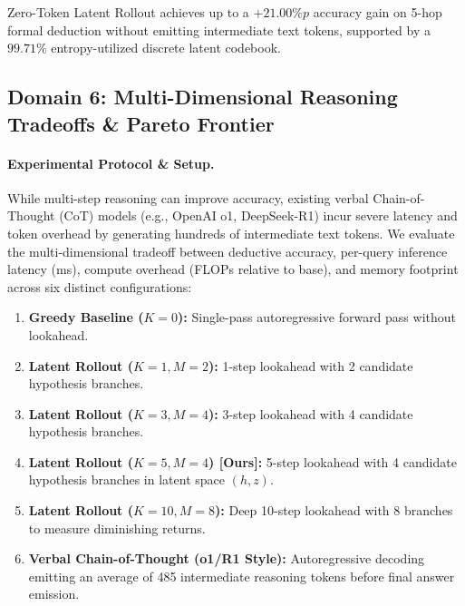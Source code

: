 \begin{takeawaybox}
Zero-Token Latent Rollout achieves up to a $+21.00\%p$ accuracy gain on 5-hop formal deduction without emitting intermediate text tokens, supported by a $99.71\%$ entropy-utilized discrete latent codebook.
\end{takeawaybox}

\subsection{Domain 6: Multi-Dimensional Reasoning Tradeoffs \& Pareto Frontier}
\label{sec:exp_tradeoff}

\paragraph{Experimental Protocol \& Setup.}
While multi-step reasoning can improve accuracy, existing verbal Chain-of-Thought (CoT) models (e.g., OpenAI o1, DeepSeek-R1) incur severe latency and token overhead by generating hundreds of intermediate text tokens. We evaluate the multi-dimensional tradeoff between deductive accuracy, per-query inference latency (ms), compute overhead (FLOPs relative to base), and memory footprint across six distinct configurations:
\begin{enumerate}[leftmargin=*]
    \item \textbf{Greedy Baseline ($K=0$):} Single-pass autoregressive forward pass without lookahead.
    \item \textbf{Latent Rollout ($K=1, M=2$):} 1-step lookahead with 2 candidate hypothesis branches.
    \item \textbf{Latent Rollout ($K=3, M=4$):} 3-step lookahead with 4 candidate hypothesis branches.
    \item \textbf{Latent Rollout ($K=5, M=4$) [Ours]:} 5-step lookahead with 4 candidate hypothesis branches in latent space $(h, z)$.
    \item \textbf{Latent Rollout ($K=10, M=8$):} Deep 10-step lookahead with 8 branches to measure diminishing returns.
    \item \textbf{Verbal Chain-of-Thought (o1/R1 Style):} Autoregressive decoding emitting an average of 485 intermediate reasoning tokens before final answer emission.
\end{enumerate}

